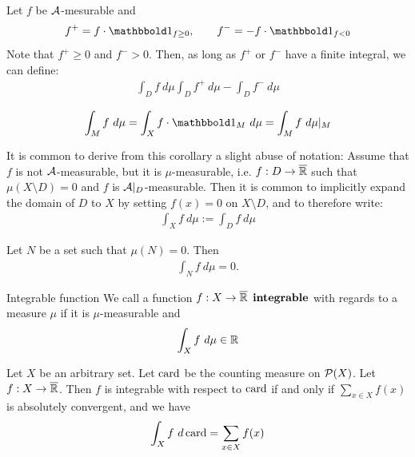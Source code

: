 \begin{definition}
	Let $f$ be $\mathcal{A}$-mesurable and
	\begin{align*}
		f^+ = f \cdot \boldone_{f \geq 0}, \qquad
		f^- = -f \cdot \boldone_{f < 0}
	\end{align*}
	Note that $f^+ \geq 0$ and $f^- > 0$. Then, as long as $f^+$ or $f^-$ have a finite integral, we can define:
	\begin{align*}
		\int_D f ~d\mu \int_D f^+ ~d\mu - \int_D f^{-} ~d\mu
	\end{align*}
\end{definition}
\begin{corollary}
	\begin{align*}
		\int_M f ~d\mu = \int_X f \cdot \boldone_M ~d\mu = \int_M f ~d\mu|_M
	\end{align*}
\end{corollary}
It is common to derive from this corollary a slight abuse of notation: Assume that $f$ is not $\mathcal{A}$-measurable, but it is $\mu$-measurable, i.e. $f : D \to \overline{{\mathbb{R}}}$ such that $\mu(X \setminus D) = 0$ and $f$ is $\mathcal{A}|_D$-measurable. Then it is common to implicitly expand the domain of $D$ to $X$ by setting $f(x) = 0$ on $X \setminus D$, and to therefore write:
\begin{align*}
	\int_X f ~d\mu := \int_D f ~d\mu
\end{align*}
\begin{corollary}
	Let $N$ be a set such that $\mu(N) = 0$. Then 
	\begin{align*}
		\displaystyle \int_N f ~d\mu = 0.
	\end{align*} 
\end{corollary}
\begin{importantdefinition}{Integrable function}{}
	We call a function $f : X \to \overline{{\mathbb{R}}}$ $\tbf{integrable}$ with regards to a measure $\mu$ if it is $\mu$-measurable and
	\begin{align*}
		\int_X f~d\mu \in \mathbb{R}
	\end{align*}
\end{importantdefinition}
\begin{proposition}
	Let $X$ be an arbitrary set. Let $\operatorname{card}$ be the counting measure on $\mathcal{P}(X)$. Let $f : X \to \overline{{\mathbb{R}}}$. Then $f$ is integrable with respect to $\operatorname{card}$ if and only if $\sum_{x \in X} f(x)$ is absolutely convergent, and we have
	\begin{align*}
		\int_X f ~d\operatorname{card} = \sum_{x \in X} f(x)
	\end{align*}
\end{proposition}
